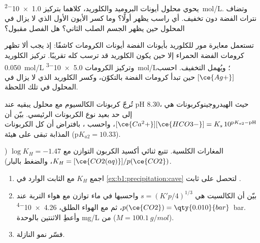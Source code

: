 \begin{exercise}[$\star\star$]\label{exo:b1:precipitation:7}
يحوي محلول أيونات البروميد والكلوريد، كلاهما بتركيز
\qty{1.0e-2}{mol/L}. وتضاف نترات الفضة دون تخفيف. أي
راسب يظهر أولًا؟ وما كسر الأيون الأول الذي لا يزال في
المحلول حين يظهر الجسم الصلب الثاني؟ هل الفصل مقبول؟
\end{exercise}

\begin{exercise}[$\star\star$]\label{exo:b1:precipitation:8}
تستعمل معايرة مور للكلوريد بأيونات الفضة أيونات الكرومات
كاشفًا: إذ يجب ألا تظهر كرومات الفضة الحمراء إلا حين يكون الكلوريد
قد ترسب كله تقريبًا. تركيز الكلوريد \qty{0.050}{mol/L} وتركيز الكرومات
\qty{5.0e-3}{mol/L}؛ ويُهمل التخفيف. احسب $[\ce{Ag+}]$ حين
تبدأ كرومات الفضة بالتكوّن، وكسر الكلوريد الذي لا يزال في
المحلول في تلك اللحظة.
\end{exercise}

\begin{exercise}[$\star\star$]\label{exo:b1:precipitation:9}
تُرجّ كربونات الكالسيوم مع محلول يبقيه  عند pH 8.30،
حيث الهيدروجينوكربونات هي إلى حد بعيد نوع الكربونات الرئيسي. بيّن أن
$[\ce{Ca^2+}][\ce{HCO3-}] = K_s\,10^{\mathrm{p}K_{a2} - \mathrm{pH}}$،
واحسب ، بافتراض أن كل الكربونات المذابة تبقى
على هيئة  ($\mathrm{p}K_{a2} = 10.33$).
\end{exercise}

\begin{exercise}[$\star\star\star$]\label{exo:b1:precipitation:10}
المغارات الكلسية. تتبع  ثنائي أكسيد الكربون التوازن
 مع $\log K_H = -1.47$ ($K_H =
[\ce{CO2(aq)}]/p(\ce{CO2})$، والضغط بالبار).
\begin{enumerate}
  \item اجمع $K_H$ مع الثابت الوارد في
        \cref{ex:b1:precipitation:cave} لتحصل على ثابت
        .
  \item بيّن أن  الكالسيت هي $s = (K'p/4)^{1/3}$
        واحسبها في ماء توازن مع هواء التربة عند
        $p(\ce{CO2}) = \qty{0.010}{bar}$، ثم مع الهواء الطلق،
        \qty{4.26e-4}{bar}. وأعطِ الاثنتين بالوحدة \unit{mg/L} من 
        ($M = \qty{100.1}{g/mol}$).
  \item فسّر نمو النازلة.
\end{enumerate}
\end{exercise}


